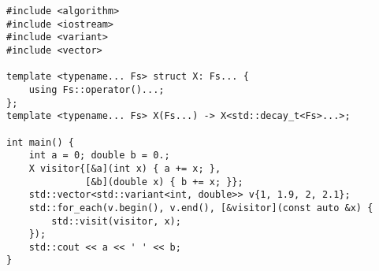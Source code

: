 \begin{lstlisting}[title=\href{https://godbolt.org/z/8j3M7v}{\texttt{godbolt.org/z/8j3M7v}}]
#include <algorithm>
#include <iostream>
#include <variant>
#include <vector>

template <typename... Fs> struct X: Fs... {
    using Fs::operator()...;
};
template <typename... Fs> X(Fs...) -> X<std::decay_t<Fs>...>;

int main() {
    int a = 0; double b = 0.;
    X visitor{[&a](int x) { a += x; },
              [&b](double x) { b += x; }};
    std::vector<std::variant<int, double>> v{1, 1.9, 2, 2.1};
    std::for_each(v.begin(), v.end(), [&visitor](const auto &x) {
        std::visit(visitor, x);
    });
    std::cout << a << ' ' << b;
}
\end{lstlisting}
